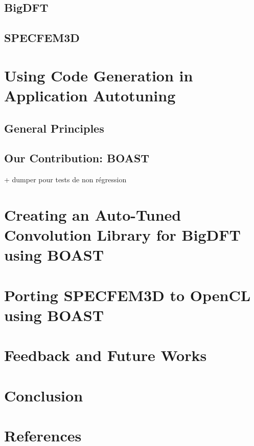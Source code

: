 \documentclass[review]{elsarticle}
\begin{document}
  \subsection{BigDFT}


  \subsection{SPECFEM3D}


\section{Using Code Generation in Application Autotuning}

  \subsection{General Principles}


  \subsection{Our Contribution: BOAST}
     + dumper pour tests de non régression


\section{Creating an Auto-Tuned Convolution Library for BigDFT using BOAST}



\section{Porting SPECFEM3D to OpenCL using BOAST}



\section{Feedback and Future Works}



\section{Conclusion}


\section*{References}


\end{document}

